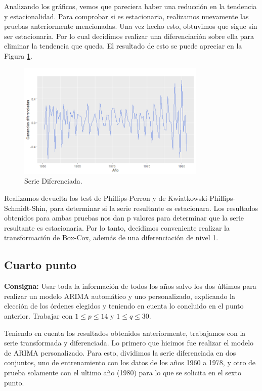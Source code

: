 \documentclass{article} %
\begin{document}
Analizando los gráficos, vemos que pareciera haber una reducción en la tendencia y estacionalidad. Para comprobar si es estacionaria, realizamos nuevamente las pruebas anteriormente mencionadas. Una vez hecho esto, obtuvimos que sigue sin ser estacionaria. Por lo cual decidimos realizar una diferenciación sobre ella para eliminar la tendencia que queda. El resultado de esto se puede apreciar en la Figura \ref{fig:Diferenciada}. 

\begin{figure}[H]
	\centering
	\includegraphics[width=0.8\textwidth]{images/4-7 Diferenciada}
	\caption{Serie Diferenciada.}
	\label{fig:Diferenciada}
\end{figure} 

Realizamos devuelta los test de Phillips-Perron y de Kwiatkowski-Phillips-Schmidt-Shin, para determinar si la serie resultante es estacionara. Los resultados obtenidos para ambas pruebas nos dan p valores para determinar que la serie resultante es estacionaria. Por lo tanto, decidimos conveniente realizar la transformación de Box-Cox, además de una diferenciación de nivel 1.


\subsection{Cuarto punto}

\textbf{Consigna:} Usar toda la información de todos los años salvo los dos últimos para realizar un modelo ARIMA automático y uno personalizado, explicando la elección de los órdenes elegidos y teniendo en cuenta lo concluido en el punto anterior. Trabajar con  $1 \leq p \leq 14$ y $1 \leq q \leq 30$.

Teniendo en cuenta los resultados obtenidos anteriormente, trabajamos con la serie transformada y diferenciada. Lo primero que hicimos fue realizar el modelo de ARIMA personalizado. Para esto, dividimos la serie diferenciada en dos conjuntos, uno de entrenamiento con los datos de los años 1960 a 1978, y otro de prueba solamente con el ultimo año (1980) para lo que se solicita en el sexto punto. 
\end{document}
